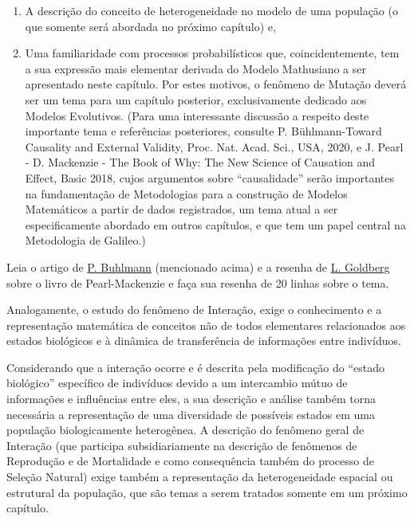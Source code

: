     \begin{enumerate}
    \item A descrição do conceito de heterogeneidade no modelo de uma população (o que somente será abordada no próximo capítulo) e,
    \item Uma familiaridade com processos probabilísticos que, coincidentemente, tem a sua expressão mais elementar derivada do Modelo Mathusiano a ser apresentado neste capítulo. Por estes motivos, o fenômeno de Mutação deverá ser um tema para um capítulo posterior, exclusivamente dedicado aos Modelos Evolutivos. (Para uma interessante discussão a respeito deste importante tema e referências posteriores, consulte P. Bühlmann-Toward Causality and External Validity, Proc. Nat. Acad. Sci., USA, 2020, e J. Pearl - D. Mackenzie - The Book of Why: The New Science of Causation and Effect, Basic 2018, cujos argumentos sobre ``causalidade'' serão importantes na fundamentação de Metodologias para a construção de Modelos Matemáticos a partir de dados registrados, um tema atual a ser especificamente abordado em outros capítulos, e que tem um papel central na Metodologia de Galileo.)
    \end{enumerate}

\begin{exercise}
    Leia o artigo de \href{https://www.pnas.org/content/pnas/117/42/25963.full.pdf}{P. Buhlmann} (mencionado acima) e a resenha de \href{https://www.ams.org/journals/notices/201907/rnoti-p1093.pdf}{L. Goldberg} sobre o livro de Pearl-Mackenzie e faça sua resenha de 20 linhas sobre o tema. 
\end{exercise}

{\color{red}
%
%
}

    Analogamente, o estudo do fenômeno de Interação, exige o conhecimento e a representação matemática de conceitos não de todos elementares relacionados aos estados biológicos e à dinâmica de transferência de informações entre indivíduos.

    Considerando que a interação ocorre e é descrita pela modificação do ``estado biológico'' específico de indivíduos devido a um intercambio mútuo de informações e influências entre eles, a sua descrição e análise também torna necessária a representação de uma diversidade de possíveis estados em uma população biologicamente heterogênea. A descrição do fenômeno geral de Interação (que participa subsidiariamente na descrição de fenômenos de Reprodução e de Mortalidade e como consequência também do processo de Seleção Natural) exige também a representação da heterogeneidade espacial ou estrutural da população, que são temas a serem tratados somente em um próximo capítulo.


